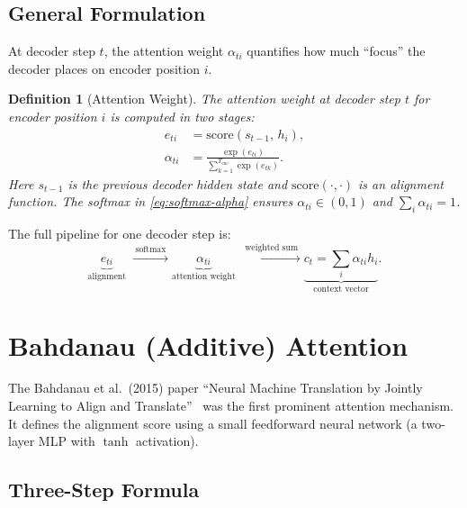 \documentclass[12pt,a4paper]{article}
\newtheorem{definition}{Definition}[section]
\begin{document}
\subsection{General Formulation}

At decoder step $t$, the attention weight $\alpha_{ti}$ quantifies
how much ``focus'' the decoder places on encoder position $i$.

\begin{definition}[Attention Weight]
\label{def:alpha}
The attention weight at decoder step $t$ for encoder position $i$
is computed in two stages:
\begin{align}
  e_{ti} &= \mathrm{score}(s_{t-1},\, h_i),
  \label{eq:align-score} \\
  \alpha_{ti} &= \frac{\exp(e_{ti})}{\displaystyle\sum_{k=1}^{T_{\mathrm{enc}}} \exp(e_{tk})}.
  \label{eq:softmax-alpha}
\end{align}
Here $s_{t-1}$ is the previous decoder hidden state and
$\mathrm{score}(\cdot, \cdot)$ is an alignment function.
The softmax in \cref{eq:softmax-alpha} ensures
$\alpha_{ti} \in (0,1)$ and $\sum_i \alpha_{ti} = 1$.
\end{definition}

The full pipeline for one decoder step is:
\begin{equation}
  \underbrace{e_{ti}}_{\text{alignment}} \;\xrightarrow{\;\mathrm{softmax}\;}
  \underbrace{\alpha_{ti}}_{\text{attention weight}} \;\xrightarrow{\;\text{weighted sum}\;}
  \underbrace{c_t = \sum_i \alpha_{ti} h_i}_{\text{context vector}}.
  \label{eq:pipeline}
\end{equation}

\section{Bahdanau (Additive) Attention}
\label{sec:bahdanau}

The Bahdanau et al.\ (2015) paper ``Neural Machine Translation by
Jointly Learning to Align and Translate''~\cite{bahdanau2015} was the
first prominent attention mechanism.  It defines the alignment score
using a small feedforward neural network (a two-layer MLP with
$\tanh$ activation).

\subsection{Three-Step Formula}
\end{document}

